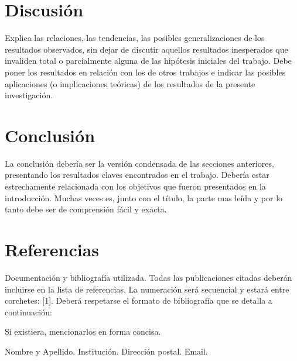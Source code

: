 \begin{multicols}{2}
\section{Discusión}
Explica las relaciones, las tendencias, las posibles
generalizaciones de los resultados observados, sin dejar
de discutir aquellos resultados inesperados que
invaliden total o parcialmente alguna de las hipótesis
iniciales del trabajo. Debe poner los resultados en
relación con los de otros trabajos e indicar las posibles
aplicaciones (o implicaciones teóricas) de los
resultados de la presente investigación.

\section{Conclusión}
La conclusión debería ser la versión condensada de
las secciones anteriores, presentando los resultados
claves encontrados en el trabajo. Debería estar
estrechamente relacionada con los objetivos que fueron
presentados en la introducción. Muchas veces es, junto
con el título, la parte mas leída y por lo tanto debe ser
de comprensión fácil y exacta.

\section{Referencias}
Documentación y bibliografía utilizada. Todas las
publicaciones citadas deberán incluirse en la lista de
referencias. La numeración será secuencial y estará
entre corchetes: [1]. Deberá respetarse el formato de
bibliografía que se detalla a continuación:


Si existiera, mencionarlos en forma concisa.

Nombre y Apellido. Institución. Dirección postal. Email.

\end{multicols}
